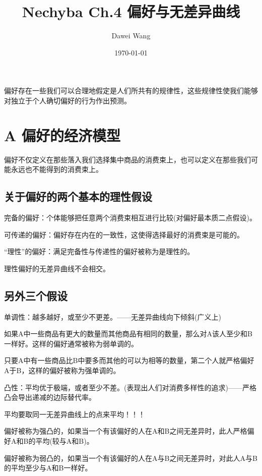\documentclass{article}
\title{Nechyba Ch.4 偏好与无差异曲线}
\author{Dawei Wang}
\date{\today}
\begin{document}
	\maketitle
偏好存在一些我们可以合理地假定是人们所共有的规律性，这些规律性使我们能够对独立于个人确切偏好的行为作出预测。
\section{A 偏好的经济模型}
偏好不仅定义在那些落入我们选择集中商品的消费束上，也可以定义在那些我们可能永远也不能得到的消费束上。

\subsection{关于偏好的两个基本的理性假设}
完备的偏好：个体能够把任意两个消费束相互进行比较(对偏好最本质二点假设)。

\hspace*{\fill}

可传递的偏好：偏好存在内在的一致性，这使得选择最好的消费束是可能的。

\hspace*{\fill}

“理性”的偏好：满足完备性与传递性的偏好被称为是理性的。

\hspace*{\fill}

理性偏好的无差异曲线不会相交。

\subsection{另外三个假设}
单调性：越多越好，或至少不更差。——无差异曲线向下倾斜(广义上)

如果A中一些商品有更大的数量而其他商品有相同的数量，那么对A该人至少和B一样好。这样的偏好通常被称为弱单调的。

只要A中有一些商品比B中要多而其他的可以为相等的数量，第二个人就严格偏好A于B，这样的偏好被称为强单调的。

\hspace*{\fill}

凸性：平均优于极端，或者至少不差。(表现出人们对消费多样性的追求)——严格凸会导出递减的边际替代率。

平均要取同一无差异曲线上的点来平均！！！

偏好被称为强凸的，如果当一个有该偏好的人在A和B之间无差异时，此人严格偏好A和B的平均(较与A和B)。

偏好被称为弱凸的，如果当一个有该偏好的人在A与B之间无差异时，对此人A与B的平均至少与A和B一样好。
\end{document}
